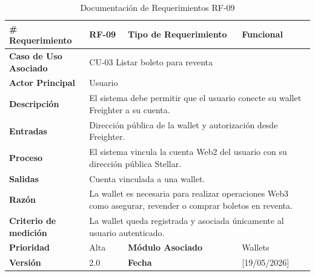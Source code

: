 \documentclass[12pt,letterpaper]{article}
\begin{document}
\begin{table}[H]
\centering
\scriptsize
\renewcommand{\arraystretch}{1.05}
\setlength{\tabcolsep}{3pt}

\newlength{\anchoceldaRFnueve}
\setlength{\anchoceldaRFnueve}{\dimexpr\textwidth-2.7cm-8\tabcolsep-5\arrayrulewidth\relax}

\begin{tabularx}{\textwidth}{|p{2.7cm}|X|p{2.8cm}|X|}
\hline
\textbf{\# Requerimiento} & RF-09 & \textbf{Tipo de Requerimiento} & Funcional \\ \hline

\textbf{Caso de Uso Asociado} & 
\multicolumn{3}{p{\anchoceldaRFnueve}|}{CU-03 Listar boleto para reventa} \\ \hline

\textbf{Actor Principal} & 
\multicolumn{3}{p{\anchoceldaRFnueve}|}{Usuario} \\ \hline

\textbf{Descripción} & 
\multicolumn{3}{p{\anchoceldaRFnueve}|}{El sistema debe permitir que el usuario conecte su wallet Freighter a su cuenta.} \\ \hline

\textbf{Entradas} & 
\multicolumn{3}{p{\anchoceldaRFnueve}|}{Dirección pública de la wallet y autorización desde Freighter.} \\ \hline

\textbf{Proceso} & 
\multicolumn{3}{p{\anchoceldaRFnueve}|}{El sistema vincula la cuenta Web2 del usuario con su dirección pública Stellar.} \\ \hline

\textbf{Salidas} & 
\multicolumn{3}{p{\anchoceldaRFnueve}|}{Cuenta vinculada a una wallet.} \\ \hline

\textbf{Razón} & 
\multicolumn{3}{p{\anchoceldaRFnueve}|}{La wallet es necesaria para realizar operaciones Web3 como asegurar, revender o comprar boletos en reventa.} \\ \hline

\textbf{Criterio de medición} & 
\multicolumn{3}{p{\anchoceldaRFnueve}|}{La wallet queda registrada y asociada únicamente al usuario autenticado.} \\ \hline

\textbf{Prioridad} & Alta & \textbf{Módulo Asociado} & Wallets \\ \hline

\textbf{Versión} & 2.0 & \textbf{Fecha} & [19/05/2026] \\ \hline

\end{tabularx}

\caption{Documentación de Requerimientos RF-09}
\label{tab:documentacion_requerimientos_rf09}
\normalsize
\end{table}
\end{document}
